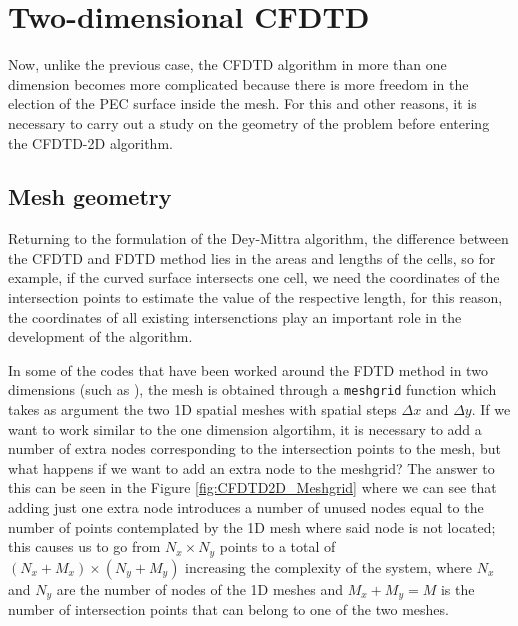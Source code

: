 \documentclass[12pt, oneside]{book}
\begin{document}
\section{Two-dimensional CFDTD}

Now, unlike the previous case, the CFDTD algorithm in more than one dimension becomes more complicated because there is more freedom in the election of the PEC surface inside the mesh. For this and other reasons, it is necessary to carry out a study on the geometry of the problem before entering the CFDTD-2D algorithm.

\subsection{Mesh geometry}

Returning to the formulation of the Dey-Mittra algorithm, the difference between the CFDTD and FDTD method lies in the areas and lengths of the cells, so for example, if the curved surface intersects one cell, we need the coordinates of the intersection points to estimate the value of the respective length, for this reason, the coordinates of all existing intersenctions play an important role in the development of the algorithm.

In some of the codes that have been worked around the FDTD method in two dimensions (such as \cite{Angulo_PyDG1D_2024}), the mesh is obtained through a \texttt{meshgrid} function \cite{harris2020array} which takes as argument the two 1D spatial meshes with spatial steps $\Delta x$ and $\Delta y$. If we want to work similar to the one dimension algortihm, it is necessary to add a number of extra nodes corresponding to the intersection points to the mesh, but what happens if we want to add an extra node to the meshgrid? The answer to this can be seen in the Figure \ref{fig:CFDTD2D_Meshgrid} where we can see that adding just one extra node introduces a number of unused nodes equal to the number of points contemplated by the 1D mesh where said node is not located; this causes us to go from $N_x \times N_y$ points to a total of $(N_x + M_x) \times (N_y + M_y)$ increasing the complexity of the system, where $N_x$ and $N_y$ are the number of nodes of the 1D meshes and $M_x + M_y = M$ is the number of intersection points that can belong to one of the two meshes. 
\end{document}
